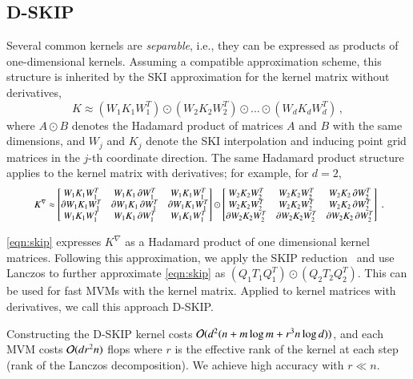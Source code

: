 \subsection{D-SKIP}
Several common kernels are {\em separable}, i.e., they can be expressed as
products of one-dimensional kernels.  Assuming a compatible approximation
scheme, this structure is inherited by the SKI approximation for the kernel
matrix without derivatives,
\begin{equation}\label{eqn:ski_sep}
  K \approx (W_1 K_1 W_1^T) \odot (W_2 K_2 W_2^T) \odot \ldots \odot (W_d K_d
  W_d^T)\,,
\end{equation}
where $A \odot B$ denotes the Hadamard product of matrices $A$ and $B$ with the
same dimensions, and $W_j$ and $K_j$ denote the SKI interpolation and inducing
point grid matrices in the $j$-th coordinate direction. The same Hadamard
product structure applies to the kernel matrix with derivatives; for example,
for $d = 2$,
\begin{equation} \label{eqn:skip}
  \resizebox{.9\hsize}{!}{
    $K^{\nabla} \approx
    \begin{bmatrix}
        W_1 K_1 W_1^T      & W_1 K_1 \dx W_1^T     & W_1 K_1 W_1^T \\
        \dx W_1 K_1 W_1^T  & \dx W_1 K_1 \dx W_1^T & \dx W_1 K_1 W_1^T \\
        W_1 K_1 W_1^T      & W_1 K_1 \dx W_1^T     & W_1 K_1 W_1^T \\
    \end{bmatrix}
    \odot
    \begin{bmatrix}
        W_2 K_2 W_2^T      & W_2 K_2 W_2^T      & W_2 K_2 \dx W_2^T \\
        W_2 K_2 W_2^T      & W_2 K_2 W_2^T      & W_2 K_2 \dx W_2^T \\
        \dx W_2 K_2 W_2^T  & \dx W_2 K_2 W_2^T  & \dx W_2 K_2 \dx W_2^T \\
    \end{bmatrix}$
  }\,.
\end{equation}

\cref{eqn:skip} expresses $K^{\nabla}$ as a Hadamard product of one dimensional
kernel matrices. Following this approximation, we apply the SKIP reduction~
\citep{gardner2018product} and use Lanczos to further approximate 
\cref{eqn:skip} as $(Q_1 T_1 Q_1^T) \odot (Q_2 T_2 Q_2^T)$. This can be used for
fast MVMs with the kernel matrix. Applied to kernel matrices with derivatives,
we call this approach D-SKIP.

Constructing the D-SKIP kernel costs $\mathcal{O}(d^2(n + m \log m+ r^3 n \log d))$,
and each MVM costs $\mathcal{O}(d r^2 n)$ flops where $r$ is the effective rank of
the kernel at each step (rank of the Lanczos decomposition). We achieve high
accuracy with $r \ll n$. 

